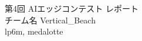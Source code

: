 \documentclass[11pt,a4j]{jarticle}
\begin{document}
\vspace*{2cm}
\thispagestyle{empty}
  \begin{center}
    {
      \Large 第4回 AIエッジコンテスト レポート
    } \\[3.5truecm]
    \LARGE
    \Large チーム名 Vertical\_Beach \\
    \Large lp6m, medalotte \\
  \end{center}


\clearpage
{}
\pagestyle{fancy}





% 

\pagestyle{plain}

% 

\end{document}

